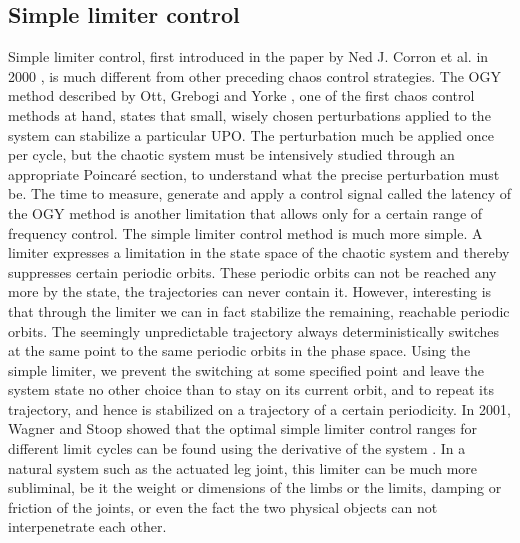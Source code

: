 \documentclass[main]{subfiles}
\begin{document}
\subsection{Simple limiter control}

Simple limiter control, first introduced in the paper by Ned J. Corron et al. in 2000 \cite{bib:Corron2000}, is much different from other preceding chaos control strategies. The OGY method described by Ott, Grebogi and Yorke \cite{bib:Ott1990}, one of the first chaos control methods at hand, states that small, wisely chosen perturbations applied to the system can stabilize a particular UPO. The perturbation much be applied once per cycle, but the chaotic system must be intensively studied through an appropriate Poincaré section, to understand what the precise perturbation must be. The time to measure, generate and apply a control signal called the latency of the OGY method is another limitation that allows only for a certain range of frequency control. The simple limiter control method is much more simple. A limiter expresses a limitation in the state space of the chaotic system and thereby suppresses certain periodic orbits. These periodic orbits can not be reached any more by the state, the trajectories can never contain it. However, interesting is that through the limiter we can in fact stabilize the remaining, reachable periodic orbits. The seemingly unpredictable trajectory always deterministically switches at the same point to the same periodic orbits in the phase space. Using the simple limiter, we prevent the switching at some specified point and leave the system state no other choice than to stay on its current orbit, and to repeat its trajectory, and hence is stabilized on a trajectory of a certain periodicity. In 2001, Wagner and Stoop showed that the optimal simple limiter control ranges for different limit cycles can be found using the derivative of the system \cite{bib:Wagner2001}. In a natural system such as the actuated leg joint, this limiter can be much more subliminal, be it the weight or dimensions of the limbs or the limits, damping or friction of the joints, or even the fact the two physical objects can not interpenetrate each other.
\end{document}
